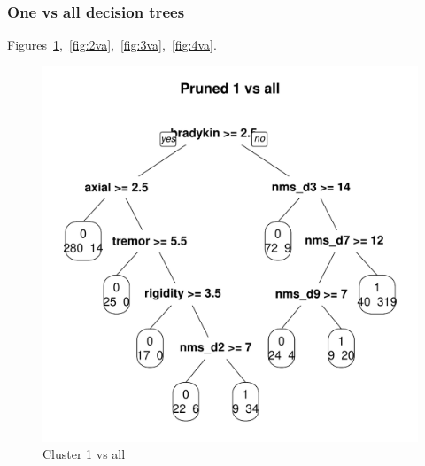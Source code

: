 \documentclass[letterpaper,12pt]{article}
\begin{document}
\subsubsection{One vs all decision trees}

Figures~\ref{fig:1va},~\ref{fig:2va},~\ref{fig:3va},~\ref{fig:4va}.

\begin{figure}[h]
  \centering
  \includegraphics[width=\linewidth]{dtree-1va-pruned.pdf}
  \caption{Cluster 1 vs all}
  \label{fig:1va}
\end{figure}
\end{document}
